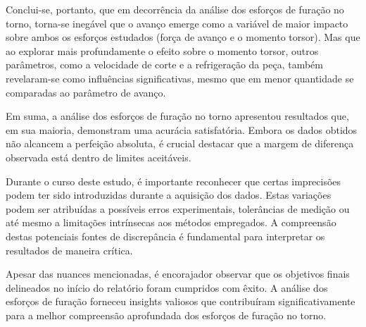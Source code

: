 \documentclass[deposito, acronym, symbols]{fei}
\begin{document}
Conclui-se, portanto, que em decorrência da análise dos esforços de furação no torno, torna-se inegável que o avanço emerge como a variável de maior impacto sobre ambos os esforços estudados (força de avanço e o momento torsor). Mas que ao explorar mais profundamente o efeito sobre o momento torsor, outros parâmetros, como a velocidade de corte e a refrigeração da peça, também revelaram-se como influências significativas, mesmo que em menor quantidade se comparadas ao parâmetro de avanço. 

Em suma, a análise dos esforços de furação no torno apresentou resultados que, em sua maioria, demonstram uma acurácia satisfatória. Embora os dados obtidos não alcancem a perfeição absoluta, é crucial destacar que a margem de diferença observada está dentro de limites aceitáveis.

Durante o curso deste estudo, é importante reconhecer que certas imprecisões podem ter sido introduzidas durante a aquisição dos dados. Estas variações podem ser atribuídas a possíveis erros experimentais, tolerâncias de medição ou até mesmo a limitações intrínsecas aos métodos empregados. A compreensão destas potenciais fontes de discrepância é fundamental para interpretar os resultados de maneira crítica.

Apesar das nuances mencionadas, é encorajador observar que os objetivos finais delineados no início do relatório foram cumpridos com êxito. A análise dos esforços de furação forneceu insights valiosos que contribuíram significativamente para a melhor compreensão aprofundada dos esforços de furação no torno.


\printbibliography
\end{document}
